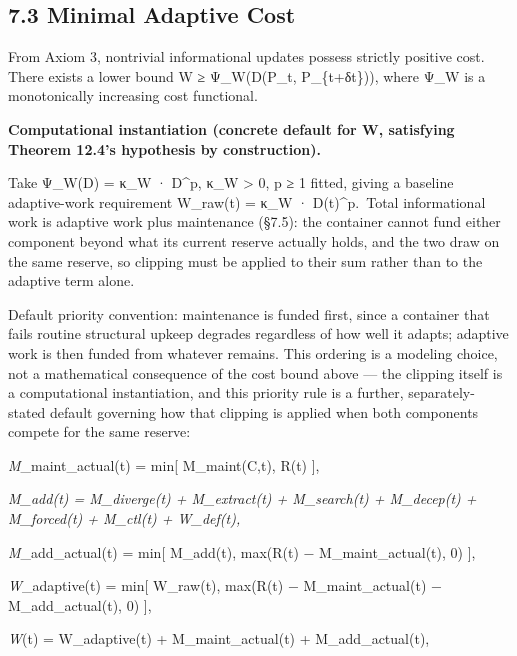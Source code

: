 \documentclass[
]{article}
\begin{document}
\hypertarget{minimal-adaptive-cost}{%
\subsection{7.3 Minimal Adaptive Cost}\label{minimal-adaptive-cost}}

From Axiom 3, nontrivial informational updates possess strictly positive
cost. There exists a lower bound W ≥ Ψ\_W(D(P\_t, P\_\{t+δt\})), where
Ψ\_W is a monotonically increasing cost functional.

\textbf{Computational instantiation (concrete default for W, satisfying
Theorem 12.4's hypothesis by construction).}

Take Ψ\_W(D) = κ\_W · D\^{}p, κ\_W \textgreater{} 0, p ≥ 1 fitted,
giving a baseline adaptive-work requirement W\_raw(t) = κ\_W ·
D(t)\^{}p.~Total informational work is adaptive work plus maintenance
(§7.5): the container cannot fund either component beyond what its
current reserve actually holds, and the two draw on the same reserve, so
clipping must be applied to their sum rather than to the adaptive term
alone.

Default priority convention: maintenance is funded first, since a
container that fails routine structural upkeep degrades regardless of
how well it adapts; adaptive work is then funded from whatever remains.
This ordering is a modeling choice, not a mathematical consequence of
the cost bound above --- the clipping itself is a computational
instantiation, and this priority rule is a further, separately-stated
default governing how that clipping is applied when both components
compete for the same reserve:

\emph{M}\_maint\_actual(t) = min{[} M\_maint(C,t), R(t) {]},

\emph{M\_add(t) = M\_diverge(t) + M\_extract(t) + M\_search(t) +
M\_decep(t) + M\_forced(t) + M\_ctl(t) + W\_def(t),}

\emph{M}\_add\_actual(t) = min{[} M\_add(t), max(R(t) −
M\_maint\_actual(t), 0) {]},

\emph{W}\_adaptive(t) = min{[} W\_raw(t), max(R(t) − M\_maint\_actual(t)
− M\_add\_actual(t), 0) {]},

\emph{W}(t) = W\_adaptive(t) + M\_maint\_actual(t) + M\_add\_actual(t),
\end{document}

